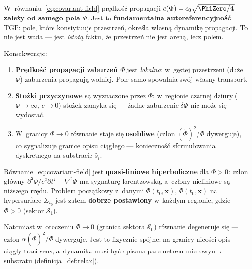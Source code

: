 \begin{remark}\label{rem:autoref}
W~r\'ownaniu~\eqref{eq:covariant-field} pr\k{e}dko\'s\'c
propagacji $c(\Phi) = c_0\sqrt{\PhiZero/\Phi}$ \textbf{zale\.zy
od samego pola} $\Phi$. Jest to \textbf{fundamentalna
autoreferencyjno\'s\'c} TGP: pole, kt\'ore konstytuuje przestrze\'n,
okre\'sla w\l{}asn\k{a} dynamik\k{e} propagacji. To nie jest
wada --- jest \emph{istot\k{a}} faktu, \.ze przestrze\'n nie jest
aren\k{a}, lecz polem.

Konsekwencje:
\begin{enumerate}[nosep]
  \item \textbf{Pr\k{e}dko\'s\'c propagacji zaburze\'n $\Phi$}
    jest \emph{lokalna}: w~g\k{e}stej przestrzeni (du\.ze $\Phi$)
    zaburzenia propaguj\k{a} wolniej. Pole samo spowalnia
    sw\'oj w\l{}asny transport.
  \item \textbf{Sto\.zki przyczynowe} s\k{a} wyznaczone
    przez $\Phi$: w~regionie czarnej dziury ($\Phi \to \infty$,
    $c \to 0$) sto\.zek zamyka si\k{e} --- \.zadne zaburzenie
    $\delta\Phi$ nie mo\.ze si\k{e} wydosta\'c.
  \item W~granicy $\Phi \to 0$ r\'ownanie staje si\k{e}
    \textbf{osobliwe} (cz\l{}on $(\dot\Phi)^2/\Phi$ dywerguje),
    co sygnalizuje granice opisu ci\k{a}g\l{}ego ---
    konieczno\'s\'c sformu\l{}owania dyskretnego na
    substracie $\hat{s}_i$.
\end{enumerate}
\end{remark}

\begin{proposition}\label{prop:hyperbolic}
R\'ownanie~\eqref{eq:covariant-field} jest \textbf{quasi-liniowe
hiperboliczne} dla $\Phi > 0$: cz\l{}on g\l{}\'owny
$\partial^2\Phi/c^2\partial t^2 - \nabla^2\Phi$ ma sygnatur\k{e}
lorentzowsk\k{a}, a~cz\l{}ony nieliniowe s\k{a} ni\.zszego rz\k{e}du.
Problem pocz\k{a}tkowy z~danymi $\Phi(t_0, \mathbf{x})$,
$\dot\Phi(t_0, \mathbf{x})$ na hypersurface $\Sigma_{t_0}$
jest zatem \textbf{dobrze postawiony} w~ka\.zdym regionie, gdzie
$\Phi > 0$ (sektor $\mathcal{S}_1$).

Natomiast w~otoczeniu $\Phi \to 0$ (granica sektora $\mathcal{S}_0$)
r\'ownanie degeneruje si\k{e} --- cz\l{}on $\alpha(\dot\Phi)^2/\Phi$
dywerguje. Jest to fizycznie sp\'ojne: na granicy nico\'sci
opis ci\k{a}g\l{}y traci sens, a~dynamika musi by\'c opisana
parametrem miarowym $\tau$ substratu
(definicja~\ref{def:relax}).
\end{proposition}

